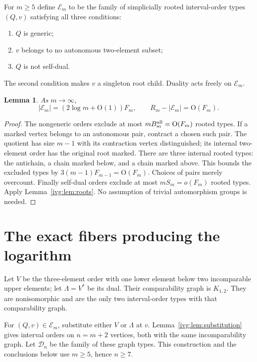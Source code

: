 \documentclass[11pt,letterpaper]{article}
\newtheorem{lemma}[theorem]{Lemma}
\theoremstyle{definition}\newtheorem{definition}[theorem]{Definition}
\theoremstyle{remark}\newtheorem{remark}[theorem]{Remark}
\newcommand{\OO}{\mathrm O}
\begin{document}
For $m\ge5$ define $\mathcal E_m$ to be the family of simplicially rooted interval-order types $(Q,v)$ satisfying all three conditions:
\begin{enumerate}
\item $Q$ is generic;
\item $v$ belongs to no autonomous two-element subset;
\item $Q$ is not self-dual.
\end{enumerate}
The second condition makes $v$ a singleton root child. Duality acts freely on $\mathcal E_m$.
\begin{lemma}\label{ivg:lem:eligible}
As $m\to\infty$,
\begin{equation}\label{ivg:eq:eligible}
 |\mathcal E_m|=(2\log m+\OO(1))F_m,
 \qquad R_m-|\mathcal E_m|=\OO(F_m).
\end{equation}
\end{lemma}
\begin{proof}
The nongeneric orders exclude at most $mB_m^{\rm all}=\OO(F_m)$ rooted types. If a marked vertex belongs to an autonomous pair, contract a chosen such pair. The quotient has size $m-1$ with its contraction vertex distinguished; its internal two-element order has the original root marked. There are three internal rooted types: the antichain, a chain marked below, and a chain marked above. This bounds the excluded types by $3(m-1)F_{m-1}=\OO(F_m)$. Choices of pairs merely overcount. Finally self-dual orders exclude at most $mS_m=o(F_m)$ rooted types. Apply Lemma~\ref{ivg:lem:roots}. No assumption of trivial automorphism groups is needed.
\end{proof}

\section{The exact fibers producing the logarithm}\label{ivg:sec:dominant}
Let $V$ be the three-element order with one lower element below two incomparable upper elements; let $\Lambda=V^*$ be its dual. Their comparability graph is $K_{1,2}$. They are nonisomorphic and are the only two interval-order types with that comparability graph.

For $(Q,v)\in\mathcal E_m$, substitute either $V$ or $\Lambda$ at $v$. Lemma~\ref{ivg:lem:substitution} gives interval orders on $n=m+2$ vertices, both with the same incomparability graph. Let $\mathcal D_n$ be the family of these graph types. This construction and the conclusions below use $m\ge5$, hence $n\ge7$.
\end{document}

